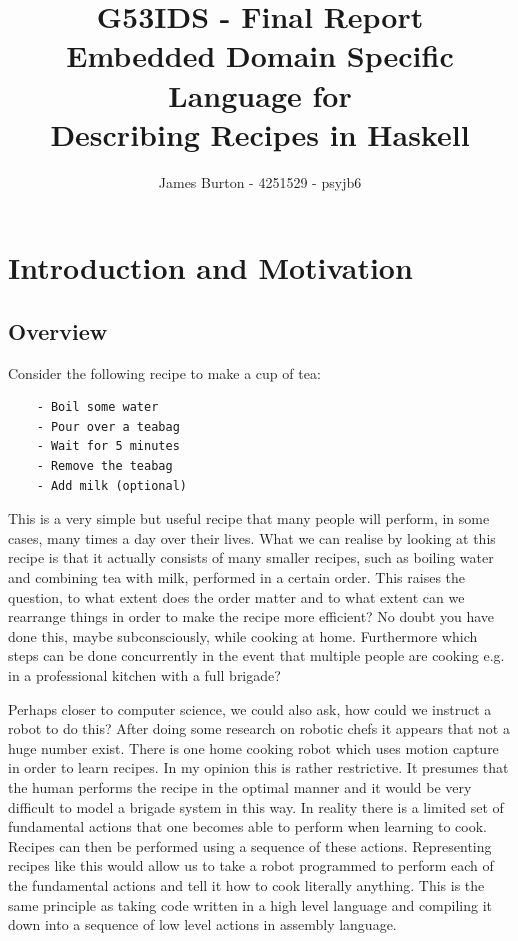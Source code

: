 \documentclass[11pt]{article}
\title
{ 
    \vspace{10em}
    G53IDS - Final Report \\
    \hfill \break
    \large Embedded Domain Specific Language for \\
    Describing Recipes in Haskell
}
\author{James Burton - 4251529 - psyjb6}
\begin{document}
\maketitle
\newpage


\newpage

\tableofcontents
\newpage

\section{Introduction and Motivation}
\subsection{Overview}
Consider the following recipe to make a cup of tea:
\begin{tt}
\small
\begin{lstlisting}
    - Boil some water
    - Pour over a teabag
    - Wait for 5 minutes
    - Remove the teabag
    - Add milk (optional)
\end{lstlisting}
\end{tt}

This is a very simple but useful recipe that many people
will perform, in some cases, many times a day over their lives.
What we can realise by looking at this recipe is that it actually
consists of many smaller recipes, such as boiling water and
combining tea with milk, performed in a certain order. This
raises the question, to what extent does the order matter and
to what extent can we rearrange things in order to make the recipe
more efficient? No doubt you have done this, maybe subconsciously,
while cooking at home. Furthermore which steps can be done
concurrently in the event that multiple people are cooking e.g.
in a professional kitchen with a full brigade?

\medbreak

Perhaps closer to computer science, we could also ask, how could
we instruct a robot to do this? After doing some research on
robotic chefs it appears that not a huge number exist.
There is one home cooking robot \cite{robot} which uses motion
capture in order to learn recipes. In my opinion this is rather
restrictive. It presumes that the human performs the recipe in
the optimal manner and it would be very difficult to model
a brigade system in this way. In reality there is a limited set
of fundamental actions that one becomes able to perform when
learning to cook. Recipes can then be performed using a sequence
of these actions. Representing recipes like this would allow us
to take a robot programmed to perform each of the fundamental
actions and tell it how to cook literally anything. This is the
same principle as taking code written in a high level language
and compiling it down into a sequence of low level actions in
assembly language.
\end{document}
